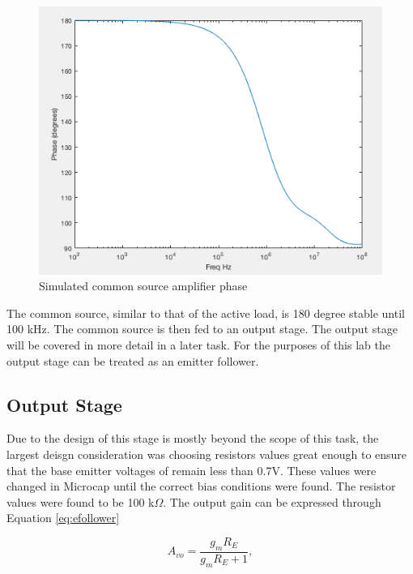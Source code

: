 \begin{figure}[H]
	\begin{center}
		\includegraphics[scale=.40]{Simulations/phasecommonsource.png}
		\caption{Simulated common source amplifier phase}
		\label{fig:csphase}
	\end{center}
\end{figure} 

The common source, similar to that of the active load, is 180 degree stable until 100 kHz.  The common source is then fed to an output stage. The output stage will be covered in more detail in a later task. For the purposes of this lab the output stage can be treated as an emitter follower.

\subsection{Output Stage}

Due to the design of this stage is mostly beyond the scope of this task, the largest deisgn consideration was choosing resistors values great enough to ensure that the base emitter voltages of remain less than 0.7V. These values were changed in Microcap until the correct bias conditions were found. The resistor values were found to be 100 k$\Omega$. The output gain can be expressed through Equation \ref{eq:efollower}

\begin{equation}
A_{vo} = \frac{g_mR_E}{g_mR_E + 1},
\label{eq:efollower}
\end{equation}


